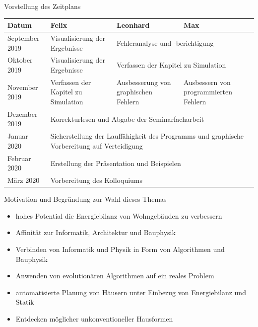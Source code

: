 \documentclass[11pt]{beamer}
\begin{document}
\begin{frame}{Vorstellung des Zeitplans}
\begin{footnotesize}
\begin{tabular}{|p{2cm}||p{2.5cm}|p{2.5cm}|p{2.5cm}|} \hline
   Datum & Felix & Leonhard & Max \\ \hline \hline
   September 2019 & Visualisierung der Ergebnisse & \multicolumn{2}{|p{5cm}|}{Fehleranalyse und -berichtigung} \\ \hline
   Oktober 2019 & Visualisierung der Ergebnisse & \multicolumn{2}{|p{5cm}|}{Verfassen der Kapitel zu Simulation} \\ \hline
   November 2019 & Verfassen der Kapitel zu Simulation & Ausbesserung von graphischen Fehlern & Ausbessern von programmierten Fehlern \\ \hline
   Dezember 2019 & \multicolumn{3}{|p{7.5cm}|}{Korrekturlesen und Abgabe der Seminarfacharbeit} \\ \hline
    Januar 2020 & \multicolumn{3}{|p{7.5cm}|}{Sicherstellung der Lauffähigkeit des Programms und graphische Vorbereitung auf Verteidigung} \\ \hline
     Februar 2020 & \multicolumn{3}{|p{7.5cm}|}{Erstellung der Präsentation und Beispielen} \\ \hline
      März 2020 & \multicolumn{3}{|p{7.5cm}|}{Vorbereitung des Kolloquiums} \\ \hline
\end{tabular}
\end{footnotesize}
\end{frame}
\begin{frame}{Motivation und Begründung zur Wahl dieses Themas}
\begin{itemize}
\pause
\item{hohes Potential die Energiebilanz von Wohngebäuden zu verbessern}\pause
\item{Affinität zur Informatik, Architektur und Bauphysik}\pause
\item{Verbinden von Informatik und Physik in Form von Algorithmen und Bauphysik}\pause
\item{Anwenden von evolutionären Algorithmen auf ein reales Problem}\pause
\item{automatisierte Planung von Häusern unter Einbezug von Energiebilanz und Statik}\pause
\item{Entdecken möglicher unkonventioneller Hausformen}
\end{itemize}
\end{frame}
\end{document}
